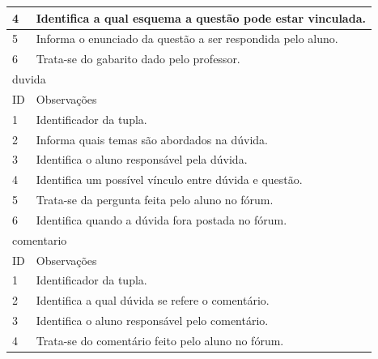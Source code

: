 \documentclass[graduacao,brazil]{ThesisPUC}
\begin{document}
\begin{table}[H]
{\begin{tabular}{|l|l|}
    4                         & Identifica a qual esquema a questão pode estar vinculada.                                  \\ \hline
    5                         & Informa o enunciado da questão a ser respondida pelo aluno.                                \\ \hline
    6                         & Trata-se do gabarito dado pelo professor.                                                  \\ \hline
    \multicolumn{2}{|l|}{duvida} \\ \hline
    ID                        & Observações                                                                                \\ \hline
    1                         & Identificador da tupla.                                                                    \\ \hline
    2                         & Informa quais temas são abordados na dúvida.                                               \\ \hline
    3                         & Identifica o aluno responsável pela dúvida.                                                \\ \hline
    4                         & Identifica um possível vínculo entre dúvida e questão.                                     \\ \hline
    5                         & Trata-se da pergunta feita pelo aluno no fórum.                                            \\ \hline
    6                         & Identifica quando a dúvida fora postada no fórum.                                          \\ \hline
    \multicolumn{2}{|l|}{comentario} \\ \hline
    ID                        & Observações                                                                                \\ \hline
    1                         & Identificador da tupla.                                                                    \\ \hline
    2                         & Identifica a qual dúvida se refere o comentário.                                           \\ \hline
    3                         & Identifica o aluno responsável pelo comentário.                                            \\ \hline
    4                         & Trata-se do comentário feito pelo aluno no fórum.                                          \\ \hline

\end{tabular}}
\end{table}
\end{document}
